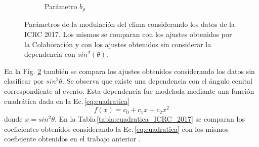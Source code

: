 \begin{figure}[H]
\begin{subfigure}[b]{\textwidth}
                    \caption{Parámetro  $b_{\rho}$	 }
                    \label{fig:brho_2017}
                    \end{subfigure}%
                    \caption{Parámetros de la modulación del clima considerando los datos de la ICRC 2017. Los mismos se comparan con los ajustes obtenidos por la Colaboración y con los ajustes obtenidos sin considerar la dependencia con $sin^2(\theta)$. }\label{fig:parameters_old}
                \end{figure}
            En la Fig. \ref{fig:parameters_old} también se compara los ajustes obtenidos considerando los datos sin clasificar por $sin^2\theta$. Se observa que existe una dependencia con el ángulo cenital correspondiente al evento. Esta dependencia fue modelada mediante una función cuadrática dada en la Ec.\,\ref{eq:cuadratica}
            \begin{equation}
                f(x) = c_0 + c_1x + c_2x^2
                \label{eq:cuadratica}
            \end{equation}
            donde $x=sin^2\theta$.  En la Tabla\,\ref{tabla:cuadratica_ICRC_2017} se comparan los coeficientes obtenidos considerando la Ec.\,\ref{eq:cuadratica} con los mismos coeficiente obtenidos en el trabajo anterior \cite{aab2017impact}. 

